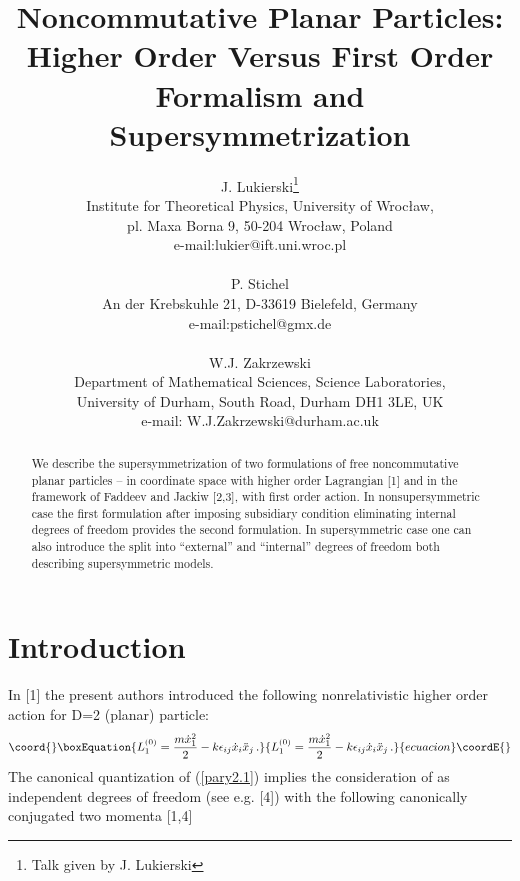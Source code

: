 \documentclass[a4paper,12pt]{article}
\begin{document}
\title{Noncommutative Planar Particles: Higher Order Versus First
  Order Formalism  and Supersymmetrization}


\author{J. Lukierski\footnote{Talk given by J. Lukierski} 
\\ 
Institute for Theoretical Physics, University of Wroc{\l}aw,
 \\
   pl. Maxa Borna 9, 50-204 Wroc{\l}aw, Poland
  \\
  e-mail:lukier@ift.uni.wroc.pl
\\ \\
P. Stichel
\\
An der Krebskuhle 21, D-33619 Bielefeld, Germany   
 \\
 e-mail:pstichel@gmx.de
 \\ \\
W.J. Zakrzewski
 \\
Department of Mathematical Sciences,
 Science Laboratories,   \\
University of Durham, South Road,
Durham DH1 3LE, UK   
 \\
 e-mail: W.J.Zakrzewski@durham.ac.uk
}

\date{}
\maketitle

\begin{abstract}

We describe the supersymmetrization of two formulations of free
noncommutative planar particles -- in coordinate space with
 higher order Lagrangian [1] and in the framework of
 Faddeev and Jackiw [2,3], with first order action.
 In nonsupersymmetric case the first formulation after imposing 
subsidiary
  condition    eliminating internal degrees of freedom
   provides the second formulation. In supersymmetric case
 one can also introduce the split into ``external'' and ``internal''
  degrees of freedom both describing supersymmetric models.

\end{abstract}


\section{Introduction}


In [1] the present authors introduced the following nonrelativistic
higher order
 action for D=2 (planar) particle:
\begin{equation}\coord{}\boxEquation{\label{pary2.1}
 { L}^{(0)}_1  =
 \frac{m\dot{x}^2_1}{2} - k \epsilon_{ij} \dot{x}_i \ddot{x}_j\, .
 }{{ L}^{(0)}_1  =
 \frac{m\dot{x}^2_1}{2} - k \epsilon_{ij} \dot{x}_i \ddot{x}_j\, .
 }{ecuacion}\coordE{}\end{equation}
The canonical quantization of (\ref{pary2.1}) implies the 
consideration of
\coordHE{} as independent degrees of freedom (see
e.g. [4]) with the following canonically conjugated   two momenta 
[1,4]
\end{document}
